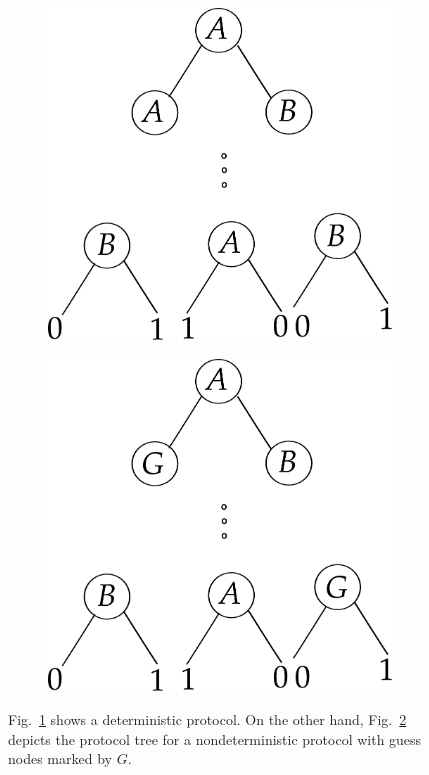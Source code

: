 \documentclass[letterpaper]{article}
\begin{document}
\begin{figure}
\centering
\begin{subfigure}[b]{0.3 \textwidth}
    \includegraphics[width=\textwidth]{det_protocol.pdf}
    \caption{}
    \label{fig:det_protocol}
\end{subfigure}
\qquad \qquad
\begin{subfigure}[b]{0.3 \textwidth}
    \includegraphics[width=\textwidth]{nondet_protocol.pdf}
    \caption{}
    \label{fig:nondet_protocol}
\end{subfigure}
\caption{Fig.~\ref{fig:det_protocol} shows a deterministic protocol. On the other hand, Fig.~\ref{fig:nondet_protocol} depicts the protocol tree for a nondeterministic protocol with guess nodes marked by $G$.}
\label{fig:nondet_protocol_tree}
\end{figure}
\end{document}
